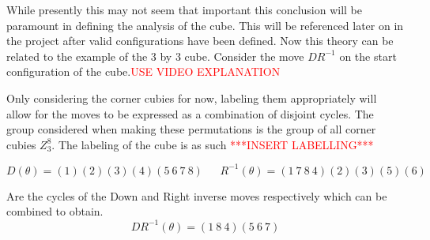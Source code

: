 \documentclass{article}
\begin{document}
While presently this may not seem that important this conclusion will be paramount in defining the analysis of the cube. This will be referenced later on in the project after valid configurations have been defined.
Now this theory can be related to the example of the 3 by 3 cube. Consider the move $DR^{-1}$ on the start configuration of the cube.\textcolor{red}{USE VIDEO EXPLANATION}


\vspace{-20pt}
\begin{figure}[hbt]
\begin{minipage}{3cm}%
\centering%
%
\end{minipage}%
\end{figure}
\vspace{20pt}
Only considering the corner cubies for now, labeling them appropriately will allow for the moves to be expressed as a combination of disjoint cycles. The group considered when making these permutations is the group of all corner cubies $Z_{3}^{8}$. The labeling of the cube is as such \textcolor{red}{***INSERT LABELLING***}


\begin{figure}[h]
\centering
\begin{minipage}{3cm}%
%
\end{minipage}%
\end{figure}




\newpage
\begin{equation}
D(\theta)= (1)(2)(3)(4)(5\ 6\ 7\ 8) \ \ \ \ \ \ \ R^{-1}(\theta)= (1\ 7\ 8\ 4)(2)(3)(5)(6)
\end{equation}

Are the cycles of the Down and Right inverse moves respectively which can be combined to obtain. 
\begin{equation}
DR^{-1}(\theta) = (1\ 8\ 4)(5\ 6\ 7)
\end{equation}
\end{document}

